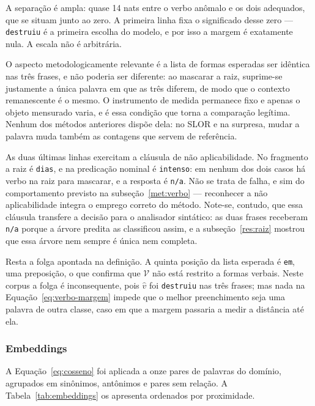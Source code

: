 A separação é ampla: quase 14 nats entre o verbo anômalo e os dois adequados, que se situam
junto ao zero. A primeira linha fixa o significado desse zero --- \texttt{destruiu} é a
primeira escolha do modelo, e por isso a margem é exatamente nula. A escala não é arbitrária.

O aspecto metodologicamente relevante é a lista de formas esperadas ser idêntica nas três
frases, e não poderia ser diferente: ao mascarar a raiz, suprime-se justamente a única palavra
em que as três diferem, de modo que o contexto remanescente é o mesmo. O instrumento de medida
permanece fixo e apenas o objeto mensurado varia, e é essa condição que torna a comparação
legítima. Nenhum dos métodos anteriores dispõe dela: no SLOR e na surpresa, mudar a palavra
muda também as contagens que servem de referência.

As duas últimas linhas exercitam a cláusula de não aplicabilidade. No fragmento a raiz é
\texttt{dias}, e na predicação nominal é \texttt{intenso}: em nenhum dos dois casos há verbo
na raiz para mascarar, e a resposta é \texttt{n/a}. Não se trata de falha, e sim do
comportamento previsto na subseção~\ref{met:verbo} --- reconhecer a não aplicabilidade integra
o emprego correto do método. Note-se, contudo, que essa cláusula transfere a decisão para o
analisador sintático: as duas frases receberam \texttt{n/a} porque a árvore predita as
classificou assim, e a subseção~\ref{res:raiz} mostrou que essa árvore nem sempre é única nem
completa.

Resta a folga apontada na definição. A quinta posição da lista esperada é \texttt{em}, uma
preposição, o que confirma que $\mathcal{V}$ não está restrito a formas verbais. Neste corpus
a folga é inconsequente, pois $\hat{v}$ foi \texttt{destruiu} nas três frases; mas nada na
Equação~\ref{eq:verbo-margem} impede que o melhor preenchimento seja uma palavra de outra
classe, caso em que a margem passaria a medir a distância até ela.

\subsubsection{Embeddings}
\label{res:embeddings}

A Equação~\ref{eq:cosseno} foi aplicada a onze pares de palavras do domínio, agrupados em
sinônimos, antônimos e pares sem relação. A Tabela~\ref{tab:embeddings} os apresenta ordenados
por proximidade.

